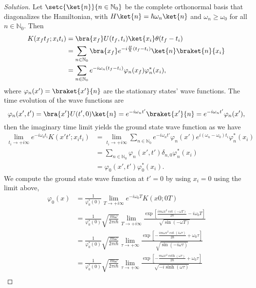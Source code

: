 \begin{proof}[Solution]
   Let \(\setc{\ket{n}}{n \in \mathbb{N}_0}\) be the complete orthonormal basis that diagonalizes the Hamiltonian, with \(H\ket{n} = \hbar \omega_n \ket{n}\) and \(\omega_n \geq \omega_0\) for all \(n \in \mathbb{N}_0.\) Then
   \begin{align*}
      K(x_f t_f; x_i t_i) &= \bra{x_f} U(t_f, t_i) \ket{x_i} \theta(t_f - t_i)\\
                          &= \sum_{n \in \mathbb{N}_0} \bra{x_f}e^{-i \frac{H}{\hbar} (t_f - t_i)}\ket{n}\braket{n}{x_i}\\
                          &= \sum_{n \in \mathbb{N}_0} e^{-i \omega_n (t_f - t_i)} \varphi_n(x_f) \varphi^*_n(x_i),
   \end{align*}
   where \(\varphi_n(x') = \braket{x'}{n}\) are the stationary states' wave functions. The time evolution of the wave functions are
   \begin{equation*}
      \varphi_n(x', t') = \bra{x'} U(t', 0) \ket{n} = e^{-i \omega_n t'} \braket{x'}{n} = e^{-i\omega_n t'} \varphi_n(x'),
   \end{equation*}
   then the imaginary time limit yields the ground state wave function as we have
   \begin{align*}
      \lim_{t_i \to + i \infty}{e^{-i \omega_0 t_i} K(x' t'; x_i t_i)}
      &= \lim_{t_i \to +i \infty}{\sum_{n \in \mathbb{N}_0} e^{-i \omega_n t'} \varphi_n(x') e^{i (\omega_n - \omega_0) t_i} \varphi^*_n(x_i)}\\
      &= \sum_{n \in \mathbb{N}_0} \varphi_n(x', t') \delta_{n,0} \varphi_n^*(x_i)\\
      &= \varphi_0(x', t') \varphi_0^*(x_i).
   \end{align*}
   We compute the ground state wave function at \(t' = 0\) by using \(x_i = 0\) using the limit above,
   \begin{align*}
      \varphi_0(x) &= \frac{1}{\varphi_0^*(0)} \lim_{T \to +i \infty}{ e^{-i \omega_0 T} K(x 0; 0 T)}\\
                   &= \frac{1}{\varphi_0^*(0)} \sqrt{\frac{m \omega}{2\pi i \hbar}} \lim_{T \to +i\infty}{\frac{\exp\left[\frac{im \omega x^2 \cot(- \omega T)}{2\hbar} - i \omega_0 T\right]}{\sqrt{\sin(-\omega T)}}}\\
                   &= \frac{1}{\varphi_0^*(0)} \sqrt{\frac{m \omega}{2\pi i \hbar}} \lim_{\tau \to +\infty}{\frac{\exp\left[-\frac{im \omega x^2 \cot(i\omega \tau)}{2\hbar} + \omega_0 \tau\right]}{\sqrt{\sin(-i\omega \tau)}}}\\
                   &= \frac{1}{\varphi_0^*(0)}\sqrt{\frac{m \omega}{2 \pi i \hbar}} \lim_{\tau \to +\infty}{\frac{\exp\left[-\frac{m \omega x^2 \coth(\omega \tau)}{2\hbar} + \omega_0 \tau\right]}{\sqrt{-i \sinh(\omega \tau)}}}\\

\end{align*}
\end{proof}
